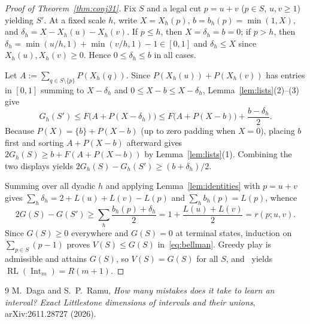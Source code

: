 \documentclass[11pt]{article}
\newcommand{\RL}{\operatorname{RL}}
\newcommand{\Int}{\operatorname{Int}}
\begin{document}
\begin{proof}[Proof of Theorem~\ref{thm:conj31}]
Fix $S$ and a legal cut $p = u + v$ ($p \in S$, $u, v \ge 1$) yielding $S'$. At a fixed scale $h$, write $X = X_h(p)$, $b = b_h(p) = \min(1, X)$, and $\delta_h = X - X_h(u) - X_h(v)$. If $p \le h$, then $X = \delta_h = b = 0$; if $p > h$, then $\delta_h = \min(u/h, 1) + \min(v/h, 1) - 1 \in [0, 1]$ and $\delta_h \le X$ since $X_h(u), X_h(v) \ge 0$. Hence $0 \le \delta_h \le b$ in all cases.

Let $A := \sum_{q \in S \setminus \{p\}} P(X_h(q))$. Since $P(X_h(u)) + P(X_h(v))$ has entries in $[0, 1]$ summing to $X - \delta_h$ and $0 \le X - b \le X - \delta_h$, Lemma~\ref{lem:lists}(2)–(3) give
\[
G_h(S') \le F\bigl(A + P(X - \delta_h)\bigr) \le F\bigl(A + P(X - b)\bigr) + \frac{b - \delta_h}{2}.
\]
Because $P(X) = \{b\} + P(X - b)$ (up to zero padding when $X = 0$), placing $b$ first and sorting $A + P(X - b)$ afterward gives $2G_h(S) \ge b + F(A + P(X - b))$ by Lemma~\ref{lem:lists}(1). Combining the two displays yields $2G_h(S) - G_h(S') \ge (b + \delta_h)/2$.

Summing over all dyadic $h$ and applying Lemma~\ref{lem:identities} with $p = u + v$ gives $\sum_h \delta_h = 2 + L(u) + L(v) - L(p)$ and $\sum_h b_h(p) = L(p)$, whence
\[
2G(S) - G(S') \ge \sum_h \frac{b_h(p) + \delta_h}{2} = 1 + \frac{L(u) + L(v)}{2} = r(p; u, v).
\]
Since $G(S) \ge 0$ everywhere and $G(S) = 0$ at terminal states, induction on $\sum_{p \in S}(p - 1)$ proves $V(S) \le G(S)$ in~\eqref{eq:bellman}. Greedy play is admissible and attains $G(S)$, so $V(S) = G(S)$ for all $S$, and~\cite[Theorem~30]{DR2026} yields $\RL(\Int_m) = R(m + 1)$.
\end{proof}

\begin{thebibliography}{9}
M.~Daga and S.~P.~Ramu,
\emph{How many mistakes does it take to learn an interval? Exact Littlestone dimensions of intervals and their unions},
arXiv:2611.28727 (2026).
\end{thebibliography}
\end{document}
